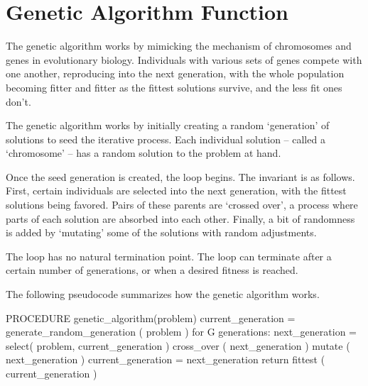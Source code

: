 \section{Genetic Algorithm Function}

The genetic algorithm works by mimicking the mechanism of chromosomes and genes in evolutionary biology. Individuals with various sets of genes compete with one another, reproducing into the next generation, with the whole population becoming fitter and fitter as the fittest solutions survive, and the less fit ones don't.

The genetic algorithm works by initially creating a random `generation' of solutions to seed the iterative process. Each individual solution -- called a `chromosome' -- has a random solution to the problem at hand.  

Once the seed generation is created, the loop begins. The invariant is as follows. First, certain individuals are selected into the next generation, with the fittest solutions being favored. Pairs of these parents are `crossed over', a process where parts of each solution are absorbed into each other. Finally, a bit of randomness is added by `mutating' some of the solutions with random adjustments. 

The loop has no natural termination point. The loop can terminate after a certain number of generations, or when a desired fitness is reached. 

The following pseudocode summarizes how the genetic algorithm works. 

\begin{python}
PROCEDURE genetic_algorithm(problem)
	current_generation = generate_random_generation ( problem )   
	for G generations:                                 
	    next_generation = select( problem, current_generation )    
	    cross_over ( next_generation )	                   
	    mutate ( next_generation )                   
	    current_generation = next_generation
	return fittest ( current_generation )           

\end{python}
